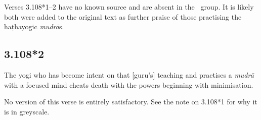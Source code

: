 \begin{ekdosis}
\begin{philcomm}[hp03_108_1]
Verses 3.108*1–2 have no known source and are absent in the \textalpha\ group. It is likely both were added to the original text as further praise of those practising the haṭhayogic \emph{mudrā}s.
\end{philcomm}


\subsection*{3.108*2}
\begin{translation}[hp03_108_2]
The yogi who has become intent on that [guru's] teaching and practises a \textit{mudrā} with a focused mind cheats death with the powers beginning with minimisation.
\end{translation}



\begin{philcomm}[hp03_108_2]
No version of this verse is entirely satisfactory. See the note on 3.108*1 for why it is in greyscale.
\end{philcomm}

\end{ekdosis}

